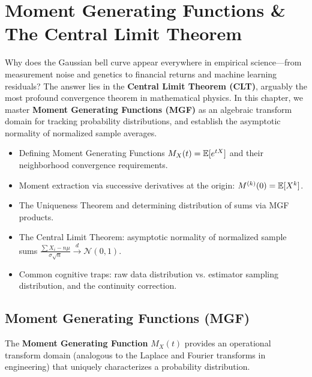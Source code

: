 \chapter{Moment Generating Functions \& The Central Limit Theorem}

Why does the Gaussian bell curve appear everywhere in empirical science---from measurement noise and genetics to financial returns and machine learning residuals? The answer lies in the \textbf{Central Limit Theorem (CLT)}, arguably the most profound convergence theorem in mathematical physics. In this chapter, we master \textbf{Moment Generating Functions (MGF)} as an algebraic transform domain for tracking probability distributions, and establish the asymptotic normality of normalized sample averages.

\vspace{0.5cm}
\begin{tcolorbox}[colback=primarylight, colframe=primarydark, title={\textbf{What You'll Learn in this Chapter}}]
\begin{itemize}
    \item Defining Moment Generating Functions $M_X(t) = \mathbb{E}[e^{tX}]$ and their neighborhood convergence requirements.
    \item Moment extraction via successive derivatives at the origin: $M^{(k)}(0) = \mathbb{E}[X^k]$.
    \item The Uniqueness Theorem and determining distribution of sums via MGF products.
    \item The Central Limit Theorem: asymptotic normality of normalized sample sums $\frac{\sum X_i - n\mu}{\sigma\sqrt{n}} \xrightarrow{d} \mathcal{N}(0, 1)$.
    \item Common cognitive traps: raw data distribution vs. estimator sampling distribution, and the continuity correction.
\end{itemize}
\end{tcolorbox}

\section{Moment Generating Functions (MGF)}

The \textbf{Moment Generating Function} $M_X(t)$ provides an operational transform domain (analogous to the Laplace and Fourier transforms in engineering) that uniquely characterizes a probability distribution.


